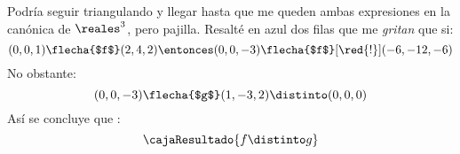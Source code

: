 \begin{enumerate}[label=(\alph*)]
        Podría seguir triangulando y llegar hasta que me queden ambas expresiones en la canónica de $\reales^3$, pero pajilla.
        Resalté en azul dos filas que me \textit{gritan} que si:
        $$
          (0,0,1) \flecha{$f$} (2,4,2)
          \entonces
          (0,0,-3) \flecha{$f$}[\red{!}] (-6,-12,-6)
        $$
        No obstante:
        $$
          (0,0,-3) \flecha{$g$} (1,-3,2) \distinto (0,0,0)
        $$
        Así se concluye que :
        $$
          \cajaResultado{
            f \distinto g
          }
        $$

\end{enumerate}

\begin{aportes}
  \item {}
\end{aportes}
